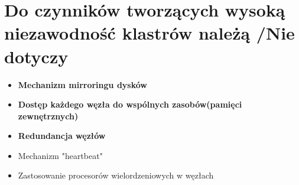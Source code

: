 \section{Do czynników tworzących wysoką niezawodność klastrów należą {\small /Nie dotyczy}}
	\begin{itemize}
    \item \textbf{Mechanizm mirroringu dysków}
    \item \textbf{Dostęp każdego węzła do wspólnych zasobów(pamięci zewnętrznych)}
    \item \textbf{Redundancja węzłów}
    \item Mechanizm "heartbeat"
    \item Zastosowanie procesorów wielordzeniowych w węzłach
    \end{itemize}
